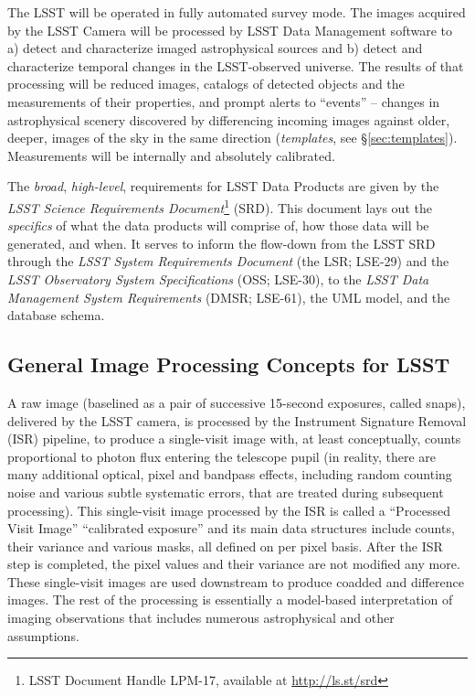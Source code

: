 \documentclass[12pt]{article}
\newcommand{\B}[1]{{\color{blue} #1}}
\newcommand{\R}[1]{{\color{red} #1}}
\begin{document}
The LSST will be operated in fully automated survey mode. The images acquired by the LSST Camera will be processed by LSST Data Management software to a) detect and characterize imaged astrophysical sources and b) detect and characterize temporal changes in the LSST-observed universe. The results of that processing will be reduced images, catalogs of detected objects and the measurements of their properties, and prompt alerts to ``events'' -- changes in astrophysical scenery discovered by differencing incoming images against older, deeper, images of the sky in the same direction (\emph{templates}, see \S \ref{sec:templates}). Measurements will be internally and absolutely calibrated.

\vspace{1em}

The \emph{broad}, \emph{high-level}, requirements for LSST Data Products are given by the \emph{LSST Science Requirements Document}\footnote{LSST Document Handle LPM-17\nocite{LPM-17}, available at \url{http://ls.st/srd}} (SRD). This document lays out the \emph{specifics} of what the data products will comprise of, how those data will be generated, and when. It serves to inform the flow-down from the LSST SRD through the \emph{LSST System Requirements Document} (the LSR; LSE-29\nocite{LSE-29}) and the \emph{LSST Observatory System Specifications} (OSS; LSE-30\nocite{LSE-30}), to the \emph{LSST Data Management System Requirements} (DMSR; LSE-61\nocite{LSE-61}), the UML model, and the database schema.


\subsection{General Image Processing Concepts for LSST}

 A raw image (baselined as a pair of successive 15-second exposures, called snaps),
delivered by the LSST camera, is processed by the Instrument Signature
Removal (ISR) pipeline, to produce a single-visit image with, at least
conceptually, counts proportional to photon flux entering the
telescope pupil (in reality, there are many additional optical, pixel and
bandpass effects, including random counting noise and various subtle
systematic errors, that are treated during subsequent processing).
This single-visit image processed by the ISR is called a \B{``Processed Visit Image''} \R{``calibrated
exposure''} and its main data structures include counts, their variance and
various masks, all defined on per pixel basis. After the ISR step is
completed, the pixel values and their variance are not modified any more.
These single-visit images are used downstream to produce coadded and difference
images. The rest of the processing is essentially a model-based interpretation
of imaging observations that includes numerous astrophysical and other
assumptions.
\end{document}
